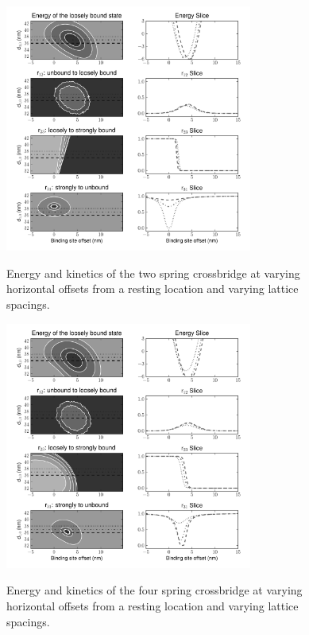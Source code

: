 \documentclass[]{article}
\begin{document}
\begin{figure}[p]
    \begin{center}
    \includegraphics[width=3.2in]{../imgs/Figure2.pdf}
    \label{fig:2s}
    \caption{
        Energy and kinetics of the two spring crossbridge at varying horizontal offsets from a resting location and varying lattice spacings.}
    \end{center}
\end{figure}

\begin{figure}[p]
    \begin{center}
    \includegraphics[width=3.2in]{../imgs/Figure3.pdf}
    \label{fig:4s}
    \caption{
        Energy and kinetics of the four spring crossbridge at varying horizontal offsets from a resting location and varying lattice spacings.}
    \end{center}
\end{figure}
\end{document}
